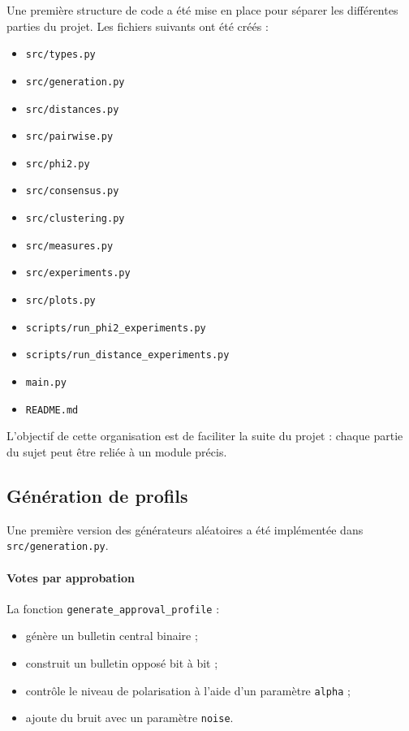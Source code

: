 \documentclass[11pt,a4paper]{article}
\begin{document}
Une premi\`ere structure de code a \'et\'e mise en place pour s\'eparer les diff\'erentes parties du projet. Les fichiers suivants ont \'et\'e cr\'e\'es :

\begin{itemize}[leftmargin=*]
    \item \texttt{src/types.py}
    \item \texttt{src/generation.py}
    \item \texttt{src/distances.py}
    \item \texttt{src/pairwise.py}
    \item \texttt{src/phi2.py}
    \item \texttt{src/consensus.py}
    \item \texttt{src/clustering.py}
    \item \texttt{src/measures.py}
    \item \texttt{src/experiments.py}
    \item \texttt{src/plots.py}
    \item \texttt{scripts/run\_phi2\_experiments.py}
    \item \texttt{scripts/run\_distance\_experiments.py}
    \item \texttt{main.py}
    \item \texttt{README.md}
\end{itemize}

L'objectif de cette organisation est de faciliter la suite du projet : chaque partie du sujet peut \^etre reli\'ee \`a un module pr\'ecis.

\subsection{G\'en\'eration de profils}

Une premi\`ere version des g\'en\'erateurs al\'eatoires a \'et\'e impl\'ement\'ee dans \texttt{src/generation.py}.

\paragraph{Votes par approbation}
La fonction \texttt{generate\_approval\_profile} :
\begin{itemize}[leftmargin=*]
    \item g\'en\`ere un bulletin central binaire ;
    \item construit un bulletin oppos\'e bit \`a bit ;
    \item contr\^ole le niveau de polarisation \`a l'aide d'un param\`etre \texttt{alpha} ;
    \item ajoute du bruit avec un param\`etre \texttt{noise}.
\end{itemize}
\end{document}
